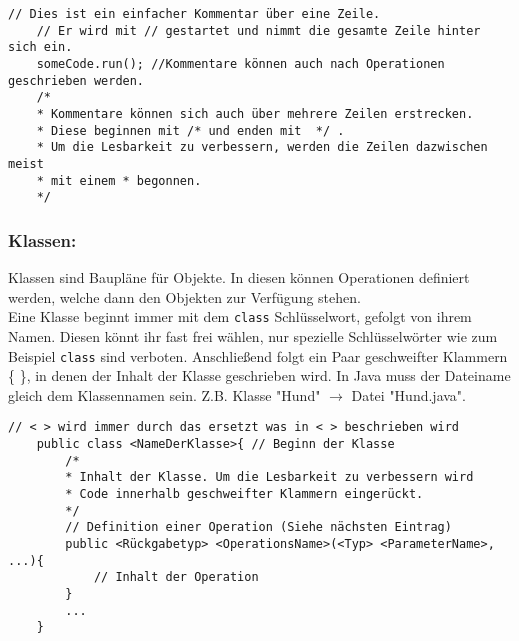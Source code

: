 \begin{lstlisting}[title=\textbf{Kommentar Beispiel}]
	// Dies ist ein einfacher Kommentar über eine Zeile.
	// Er wird mit // gestartet und nimmt die gesamte Zeile hinter sich ein.
	someCode.run(); //Kommentare können auch nach Operationen geschrieben werden.
	/*
	* Kommentare können sich auch über mehrere Zeilen erstrecken.
	* Diese beginnen mit /* und enden mit  */ . 
	* Um die Lesbarkeit zu verbessern, werden die Zeilen dazwischen meist 
	* mit einem * begonnen.
	*/
\end{lstlisting}
\lstset{
	basicstyle=\small
}
\begin{Infobox}
	
	\subsubsection*{Klassen:}
	Klassen sind Baupläne für Objekte.
	In diesen können Operationen definiert werden, welche dann den Objekten zur Verfügung stehen.\\
	Eine Klasse beginnt immer mit dem \lstinline{class} Schlüsselwort, gefolgt von ihrem Namen.
	Diesen könnt ihr fast frei wählen, nur spezielle Schlüsselwörter wie zum Beispiel \lstinline{class} sind verboten.
	Anschließend folgt ein Paar geschweifter Klammern \{ \}, in denen der Inhalt der Klasse geschrieben wird.
	In Java muss der Dateiname gleich dem Klassennamen sein. Z.B. Klasse "Hund" $\rightarrow$ Datei "Hund.java".
\end{Infobox}
\begin{lstlisting}[title=\textbf{Klassen Syntax}]
	// < > wird immer durch das ersetzt was in < > beschrieben wird
	public class <NameDerKlasse>{ // Beginn der Klasse
		/*  
		* Inhalt der Klasse. Um die Lesbarkeit zu verbessern wird
		* Code innerhalb geschweifter Klammern eingerückt.
		*/
		// Definition einer Operation (Siehe nächsten Eintrag)
		public <Rückgabetyp> <OperationsName>(<Typ> <ParameterName>, ...){
			// Inhalt der Operation
		}
		...
	}
\end{lstlisting}

\newpage

